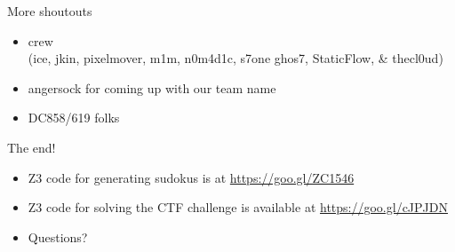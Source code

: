 \begin{frame}{More shoutouts}
    \begin{itemize}
        \item \VaporSec crew \\ (ice, jkin, pixelmover, m1m, n0m4d1c, s7one ghos7,
              StaticFlow, \& thecl0ud)
        \item angersock for coming up with our team name
        \item DC858/619 folks
    \end{itemize}
\end{frame}

\begin{frame}{The end!}
    \begin{itemize}
        \item Z3 code for generating sudokus is at \url{https://goo.gl/ZC1546}
        \item Z3 code for solving the CTF challenge is available at
              \url{https://goo.gl/cJPJDN}
        \item Questions?
    \end{itemize}
\end{frame}
